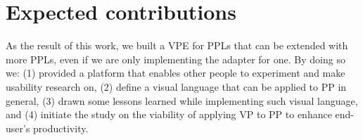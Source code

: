 \section{Expected contributions}

As the result of this work, we built a VPE for PPLs that can
be extended with more PPLs, even if we are only implementing the adapter for one.
By doing so we: (1) provided a platform that enables other people to experiment
and make usability research on, (2) define a visual language that can be applied to PP in general,
(3) drawn some lessons learned while implementing such visual language, and (4)
initiate the study on the viability of applying VP to PP to enhance end-user's
productivity.
